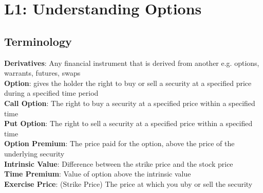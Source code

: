 \documentclass{cheatsheet}
\author{ehaller, seyohnp}
\begin{document}
    \section*{L1: Understanding Options}
    \subsection*{Terminology}
        \textbf{Derivatives}: Any financial instrument that is derived from another e.g. options, warrants, futures, swaps\\
        \textbf{Option}: gives the holder the right to buy or sell a security at a specified price during a specified time period\\
        \textbf{Call Option}: The right to buy a security at a specified price within a specified time\\
        \textbf{Put Option}: The right to sell a security at a specified price within a specified time\\
        \textbf{Option Premium}: The price paid for the option, above the price of the underlying security\\
        \textbf{Intrinsic Value}: Difference between the strike price and the stock price\\
        \textbf{Time Premium}: Value of option above the intrinsic value\\
        \textbf{Exercise Price}: (Strike Price) The price at which you uby or sell the security\\
\end{document}
